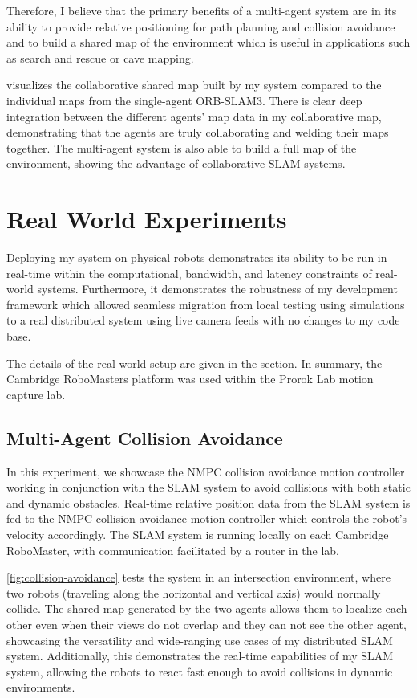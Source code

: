 Therefore, I believe that the primary benefits of a multi-agent system are in its ability to provide relative positioning for path planning and collision avoidance and to build a shared map of the environment which is useful in applications such as search and rescue or cave mapping.

 visualizes the collaborative shared map built by my system compared to the individual maps from the single-agent ORB-SLAM3. There is clear deep integration between the different agents' map data in my collaborative map, demonstrating that the agents are truly collaborating and welding their maps together. The multi-agent system is also able to build a full map of the environment, showing the advantage of collaborative SLAM systems.


\section{Real World Experiments}
\label{sec:real-world-experiments}
Deploying my system on physical robots demonstrates its ability to be run in real-time within the computational, bandwidth, and latency constraints of real-world systems. Furthermore, it demonstrates the robustness of my development framework which allowed seamless migration from local testing using simulations to a real distributed system using live camera feeds with no changes to my code base.

The details of the real-world setup are given in the  section. In summary, the Cambridge RoboMasters platform was used within the Prorok Lab motion capture lab.

\subsection{Multi-Agent Collision Avoidance}
\label{sec:multi-agent-collision-avoidance}
In this experiment, we showcase the NMPC collision avoidance motion controller working in conjunction with the SLAM system to avoid collisions with both static and dynamic obstacles. Real-time relative position data from the SLAM system is fed to the NMPC collision avoidance motion controller which controls the robot's velocity accordingly. The SLAM system is running locally on each Cambridge RoboMaster, with communication facilitated by a router in the lab.

\autoref{fig:collision-avoidance} tests the system in an intersection environment, where two robots (traveling along the horizontal and vertical axis) would normally collide. The shared map generated by the two agents allows them to localize each other even when their views do not overlap and they can not see the other agent, showcasing the versatility and wide-ranging use cases of my distributed SLAM system. Additionally, this demonstrates the real-time capabilities of my SLAM system, allowing the robots to react fast enough to avoid collisions in dynamic environments.

